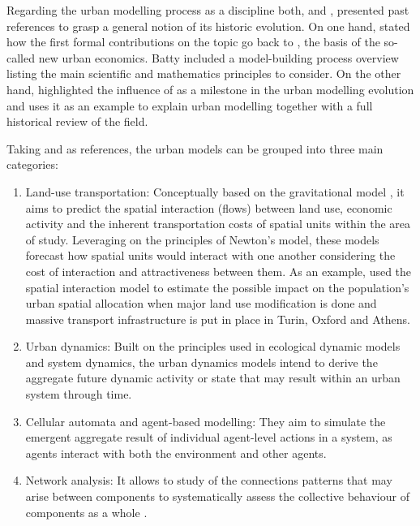 \documentclass[12pt, a4paper]{report}
\begin{document}
Regarding the urban modelling process as a discipline both, \cite{battyUrbanModeling2009a} and \cite{wilsonFutureUrbanModelling2018}, presented past references to grasp a general notion of its historic evolution. On one hand, \cite{battyUrbanModeling2009a} stated how the first formal contributions on the topic go back to \cite{alonsoLocationLandUse1964}, the basis of the so-called new urban economics. Batty included a model-building process overview listing the main scientific and mathematics principles to consider. On the other hand, \cite{wilsonScienceCitiesRegions2012} highlighted the influence of \cite{lowryModelMetropolis1964} as a milestone in the urban modelling evolution and uses it as an example to explain urban modelling together with a full historical review of the field.

Taking \cite{battyUrbanModeling2009a} and \cite{wilsonFutureUrbanModelling2018} as references, the urban models can be grouped into three main categories: 

\begin{enumerate}
  \item Land-use transportation: Conceptually based on the gravitational model \citep{wilsonFamilySpatialInteraction1971a}, it aims to predict the spatial interaction (flows) between land use, economic activity and the inherent transportation costs of spatial units within the area of study. Leveraging on the principles of Newton's model, these models forecast how spatial units would interact with one another considering the cost of interaction and attractiveness between them. As an example, \cite{lopaneLanduseTransportinteractionFramework2023} used the spatial interaction model to estimate the possible impact on the population's urban spatial allocation when major land use modification is done and massive transport infrastructure is put in place in Turin, Oxford and Athens.
  \item Urban dynamics: Built on the principles used in ecological dynamic models and system dynamics, the urban dynamics models intend to derive the aggregate future dynamic activity or state that may result within an urban system through time.
  \item Cellular automata and agent-based modelling: They aim to simulate the emergent aggregate result of individual agent-level actions in a system, as agents interact with both the environment and other agents.
  \item Network analysis: It allows to study of the connections patterns that may arise between components to systematically assess the collective behaviour of components as a whole \citep{newmanNetworksIntroduction2010}.
\end{enumerate}
\end{document}
